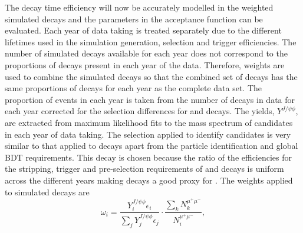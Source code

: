 The decay time efficiency will now be accurately modelled in the weighted simulated \bsmumu decays and the parameters in the acceptance function can be evaluated. Each year of data taking is treated separately due to the different \bs lifetimes used in the simulation generation, selection and trigger efficiencies. The number of simulated decays available for each year does not correspond to the proportions of decays present in each year of the data. Therefore, weights are used to combine the simulated decays so that the combined set of decays has the same proportions of decays for each year as the complete data set. 
The proportion of events in each year is taken from the number of \bsjpsiphi decays in data for each year corrected for the selection differences for \bsmumu and \bsjpsiphi decays. The \bsjpsiphi yields, $Y^{J/\psi \phi}$, are extracted from maximum likelihood fits to the mass spectrum of candidates in each year of data taking. The selection applied to identify \bsjpisphi candidates is very similar to that applied to \bsmumu decays apart from the particle identification and global BDT requirements. This decay is chosen because the ratio of the efficiencies for the stripping, trigger and pre-selection requirements of \bsmumu and \bsjpsiphi decays is uniform across the different years making \bsjpsiphi decays a good proxy for \bsmumu. 
The weights applied to simulated \bsmumu decays are
\begin{equation}
\omega_{i}  = \frac{Y_{i}^{J/\psi \phi} \epsilon_{i}}{\displaystyle\sum_{j} Y_{j}^{J/\psi \phi} \epsilon_{j}} \cdot \frac{\displaystyle\sum_{k} N_{k}^{\mu^{+}\mu^{-}}}{N_{i}^{\mu^{+}\mu^{-}}},
\end{equation}
